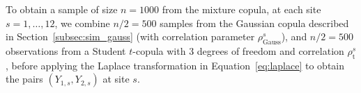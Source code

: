 \documentclass[12pt,compact]{article}
\newcommand{\rhou}[1]{\rho_{\text{#1}}}
\begin{document}
To obtain a sample of size $n = 1000$ from the mixture copula, at each site $s =1, \ldots, 12$, we combine $n/2 = 500$ samples from the Gaussian copula described in Section~\ref{subsec:sim_gauss} (with correlation parameter $\rhou{Gauss}^s$), and $n/2 = 500$ observations from a Student $t$-copula with 3 degrees of freedom and correlation $\rhou{t}^s$, before applying the Laplace transformation in Equation~\eqref{eq:laplace} to obtain the pairs $(Y_{1,s}, Y_{2,s})$ at site $s$.
\end{document}
